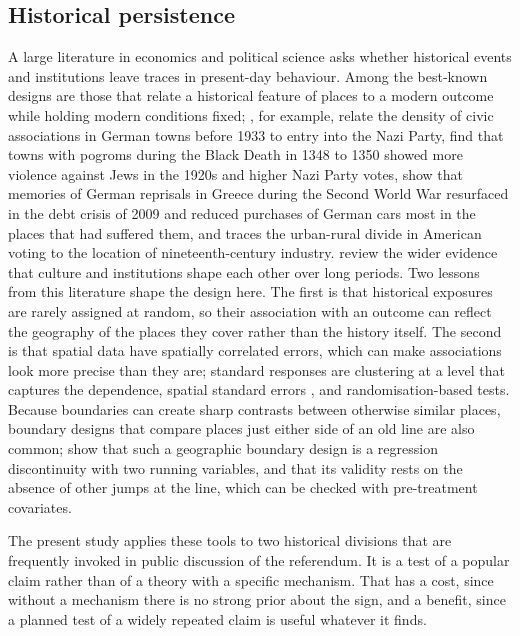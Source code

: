 \documentclass[11pt,a4paper]{article}
\begin{document}
\subsection{Historical persistence}
A large literature in economics and political science asks whether historical events and institutions leave traces in present-day behaviour. Among the best-known designs are those that relate a historical feature of places to a modern outcome while holding modern conditions fixed; \citet{satyanath2017}, for example, relate the density of civic associations in German towns before 1933 to entry into the Nazi Party, \citet{voigtlaender2012} find that towns with pogroms during the Black Death in 1348 to 1350 showed more violence against Jews in the 1920s and higher Nazi Party votes, \citet{fouka2023} show that memories of German reprisals in Greece during the Second World War resurfaced in the debt crisis of 2009 and reduced purchases of German cars most in the places that had suffered them, and \citet{rodden2019} traces the urban-rural divide in American voting to the location of nineteenth-century industry. \citet{alesina2015} review the wider evidence that culture and institutions shape each other over long periods. Two lessons from this literature shape the design here. The first is that historical exposures are rarely assigned at random, so their association with an outcome can reflect the geography of the places they cover rather than the history itself. The second is that spatial data have spatially correlated errors, which can make associations look more precise than they are; standard responses are clustering at a level that captures the dependence, spatial standard errors \citep{conley1999}, and randomisation-based tests. Because boundaries can create sharp contrasts between otherwise similar places, boundary designs that compare places just either side of an old line are also common; \citet{keele2015} show that such a geographic boundary design is a regression discontinuity with two running variables, and that its validity rests on the absence of other jumps at the line, which can be checked with pre-treatment covariates.

The present study applies these tools to two historical divisions that are frequently invoked in public discussion of the referendum. It is a test of a popular claim rather than of a theory with a specific mechanism. That has a cost, since without a mechanism there is no strong prior about the sign, and a benefit, since a planned test of a widely repeated claim is useful whatever it finds.
\end{document}
